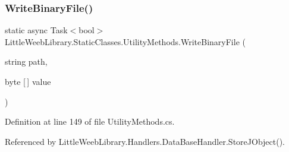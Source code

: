 \subsubsection{\texorpdfstring{Write\+Binary\+File()}{WriteBinaryFile()}}
{\footnotesize\ttfamily static async Task$<$bool$>$ Little\+Weeb\+Library.\+Static\+Classes.\+Utility\+Methods.\+Write\+Binary\+File (\begin{DoxyParamCaption}\item[{string}]{path,  }\item[{byte \mbox{[}$\,$\mbox{]}}]{value }\end{DoxyParamCaption})\hspace{0.3cm}{\ttfamily [static]}}



Definition at line 149 of file Utility\+Methods.\+cs.



Referenced by Little\+Weeb\+Library.\+Handlers.\+Data\+Base\+Handler.\+Store\+J\+Object().


